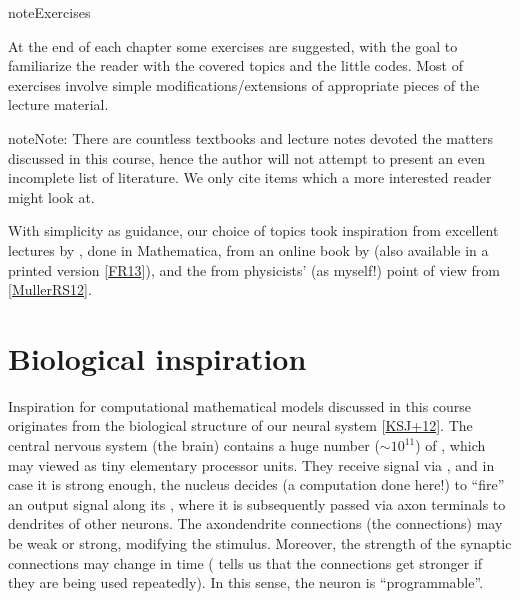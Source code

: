 \documentclass[letterpaper,10pt,english]{jupyterBook}
\begin{document}
\begin{sphinxadmonition}{note}{Exercises}

\sphinxAtStartPar
At the end of each chapter some exercises are suggested, with the goal to familiarize the reader with the covered topics and the little codes. Most of exercises involve simple modifications/extensions of appropriate pieces of the lecture material.
\end{sphinxadmonition}

\begin{sphinxadmonition}{note}{Note:}
\sphinxAtStartPar
There are countless textbooks and lecture notes devoted the matters discussed in this course, hence the author will not attempt to present an even incomplete list of literature. We only cite items which a more interested reader might look at.
\end{sphinxadmonition}

\sphinxAtStartPar
With simplicity as guidance, our choice of topics took inspiration from excellent lectures by , done in Mathematica, from an on\sphinxhyphen{}line book by  (also available in a printed version {[}\hyperlink{cite.docs/conclusion:id8}{FR13}{]}), and the from physicists’ (as myself!) point of view from {[}\hyperlink{cite.docs/conclusion:id7}{MullerRS12}{]}.


\section{Biological inspiration}
\label{\detokenize{docs/intro:biological-inspiration}}
\sphinxAtStartPar
Inspiration for computational mathematical models discussed in this course originates from the biological structure of our neural system {[}\hyperlink{cite.docs/conclusion:id6}{KSJ+12}{]}. The central nervous system (the brain) contains a huge number (\(\sim 10^{11}\)) of , which may viewed as tiny elementary processor units. They receive signal via , and in case it is strong enough, the nucleus decides (a computation done here!) to “fire” an output signal along its , where it is subsequently passed via axon terminals to dendrites of other neurons. The axon\sphinxhyphen{}dendrite connections (the  connections) may be weak or strong, modifying the stimulus. Moreover, the strength of the synaptic connections may change in time ( tells us that the connections get stronger if they are being used repeatedly). In this sense, the neuron is “programmable”.
\end{document}
